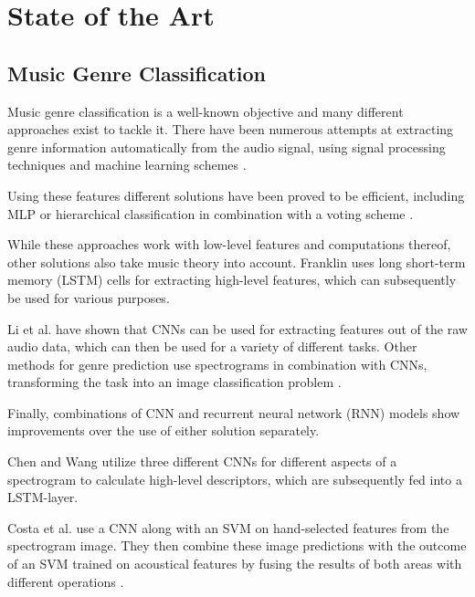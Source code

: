 
\chapter{State of the Art}

\label{stateofart}

\section{Music Genre Classification}

Music genre classification is a well-known objective and many different approaches exist to tackle it.
There have been numerous attempts at extracting genre information automatically from the audio signal, 
using signal processing techniques and machine learning schemes \cite{Aucouturier2003}.

Using these features different solutions have been proved to be efficient, 
including MLP or hierarchical classification in combination with a voting scheme \cite{Murauer2017}.

While these approaches work with low-level features and computations thereof, other solutions also take music theory into account.
Franklin \cite{Franklin2006} uses long short-term memory (LSTM) cells for extracting high-level features, which can subsequently be used for various
purposes. 

Li et al. \cite{Li2010} have shown that CNNs can be used for extracting features out of the raw audio data, which can then be used
for a variety of different tasks.
Other methods for genre prediction use spectrograms in combination with CNNs, transforming the task into an image classification
problem \cite{Gwardys2014}.

Finally, combinations of CNN and recurrent neural network
(RNN) models show improvements over the use of either solution
separately. 

Chen and Wang \cite{Chen2017} utilize three different CNNs for
different aspects of a spectrogram to calculate high-level descriptors,
which are subsequently fed into a LSTM-layer. 

Costa et al. \cite{Costa2017} use a CNN along with an SVM on hand-selected features from the
spectrogram image. They then combine these image predictions
with the outcome of an SVM trained on acoustical features by fusing
the results of both areas with different operations \cite{Murauer2018}.

